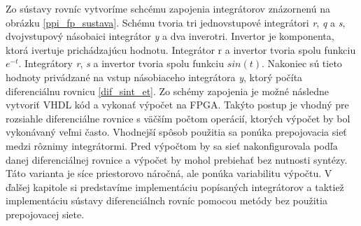 Zo sústavy rovníc vytvoríme schcému zapojenia integrátorov znázornenú na obrázku \ref{ppi_fp_sustava}. Schému tvoria tri jednovstupové integrátori \textit{r}, \textit{q} a \textit{s}, dvojvstupový násobaici integrátor \textit{y} a dva inverotri. Invertor je komponenta, ktorá ivertuje prichádzajúcu hodnotu. Integrátor r a invertor tvoria spolu funkciu $ e^{-t} $. Integrátory \textit{r}, \textit{s} a invertor tvoria spolu funkciu $ sin(t) $. Nakoniec sú tieto hodnoty privádzané na vstup násobiaceho integrátora \textit{y}, ktorý počíta diferenciálnu rovnicu \ref{dif_sint_et}.
Zo schémy zapojenia je možné následne vytvoriť VHDL kód a vykonať výpočet na FPGA. Takýto postup je vhodný pre rozsiahle diferenciálne rovnice s väčším počtom operácií, ktorých výpočet by bol vykonávaný veľmi často. Vhodnejší spôsob použitia sa ponúka prepojovacia sieť medzi rôznimy integrátormi. Pred výpočtom by sa sieť nakonfigurovala podľa danej diferenciálnej rovnice a výpočet by mohol prebiehať bez nutnosti syntézy. Táto varianta je síce priestorovo náročná, ale ponúka variabilitu výpočtu.
V ďalšej kapitole si predstavíme implementáciu popísaných integrátorov a taktiež implementáciu sústavy diferenciálnch rovníc pomocou metódy bez použitia prepojovacej siete.
\bigskip

